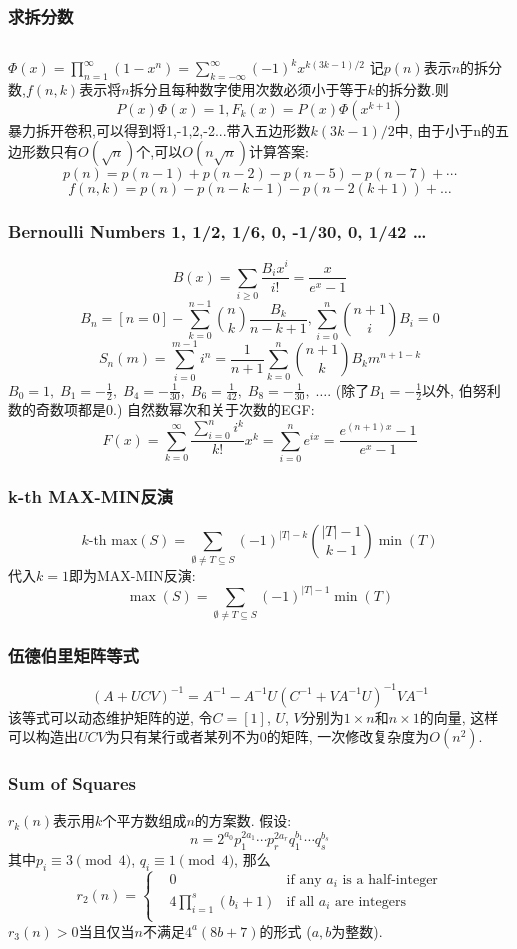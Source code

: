 \subsubsection{求拆分数}
\inputminted{python}{src/TipsandHints/partition.py}
$ \Phi(x) = \prod_{n=1}^{\infty}(1-x^n) =\sum_{k=-\infty}^{\infty}{(-1)^kx^{k(3k-1)/2}} $
记$p(n)$表示$n$的拆分数,$f(n,k)$表示将$n$拆分且每种数字使用次数必须小于等于$k$的拆分数.则
\[ P(x)\Phi(x)=1, F_k(x) = P(x) \Phi(x^{k+1}) \]
暴力拆开卷积,可以得到将1,-1,2,-2...带入五边形数$k(3k-1)/2$中,
由于小于n的五边形数只有$O(\sqrt{n})$个,可以$O(n\sqrt{n})$计算答案:
\[ p(n) = p(n-1)+p(n-2)-p(n-5)-p(n-7)+\cdots \]
\[ f(n, k) = p(n)-p(n-k-1)-p(n-2(k+1))+ \dots \]

\subsubsection{Bernoulli Numbers 1, 1/2, 1/6, 0, -1/30, 0, 1/42 \dots}
\[ B(x)=\sum_{i\ge 0}\frac{B_i x^i}{i!}=\frac x{e^x-1} \]
\[ B_n=[n=0]-\sum_{k=0}^{n-1}\binom{n}{k}\frac{B_k}{n-k+1}, \sum_{i=0}^n\binom{n+1}{i}B_i=0 \]
\[ S_n(m)=\sum_{i=0}^{m-1}i^n=\frac{1}{n+1}\sum_{k=0}^n\binom{n+1}{k}B_k m^{n+1-k} \]
$ B_0 = 1,\; B_1 = -\frac 1 2,\; B_4 = -\frac 1 {30},\; B_6 = \frac 1 {42},\; B_8 = -\frac 1{30},\; \dots$.
(除了$B_1 = -\frac 1 2$以外, 伯努利数的奇数项都是$0$.)
自然数幂次和关于次数的EGF:
\[ F(x)=\sum_{k=0}^\infty \frac{\sum_{i=0}^n i^k}{k!}x^k =\sum_{i=0}^n e^{ix} =\frac{e^{(n+1)x}-1}{e^x-1} \]

\subsubsection{k-th MAX-MIN反演}
\[k\text{-th max}(S)=\sum_{\emptyset \neq T \subseteq S}(-1)^{|T|-k}\binom{|T|-1}{k-1}\min(T)\]
代入$k=1$即为MAX-MIN反演:
\[\max(S)=\sum_{\emptyset \neq T \subseteq S}(-1)^{|T|-1}\min(T)\]

\subsubsection{伍德伯里矩阵等式}
\[(A+UCV)^{-1}=A^{-1}-A^{-1}U(C^{-1}+VA^{-1}U)^{-1}VA^{-1}\]
该等式可以动态维护矩阵的逆, 令$C=[1]$, $U$, $V$分别为$1\times n$和$n\times 1$的向量, 这样可以构造出$UCV$为只有某行或者某列不为0的矩阵, 一次修改复杂度为$O(n^2)$.

\subsubsection{Sum of Squares}
$r_k(n)$表示用$k$个平方数组成$n$的方案数. 假设: 
\[n=2^{a_0}p_1^{2a_1}\cdots p_r^{2a_r}q_1^{b_1}\cdots q_s^{b_s}\]
其中$p_i\equiv 3 \pmod 4$, $q_i\equiv 1 \pmod 4$, 那么
\[r_2(n)=\left\{\begin{aligned}
& 0 & \text{if any }a_i\text{ is a half-integer}\\
& 4\prod_{i=1}^s(b_i+1) & \text{if all }a_i\text{ are integers}\\
\end{aligned}\right.\]
$r_3(n)>0$当且仅当$n$不满足$4^a(8b+7)$的形式 ($a,b$为整数).
